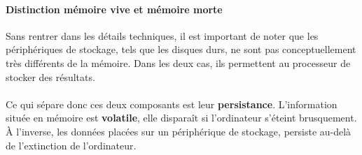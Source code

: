 {  \paragraph{Distinction mémoire vive et mémoire morte} Sans rentrer dans les détails techniques, il
  est important de noter que les périphériques de stockage, tels que les disques durs,
  ne sont pas conceptuellement très différents de la mémoire. Dans les deux cas, ils permettent au
  processeur de stocker des résultats.

  \paragraph{} Ce qui sépare donc ces deux composants est leur \textbf{persistance}. L'information
  située en mémoire est \textbf{volatile}, elle disparaît si l'ordinateur s'éteint brusquement. À
  l'inverse, les données placées sur un périphérique de stockage, persiste au-delà de l'extinction de
  l'ordinateur.
}


